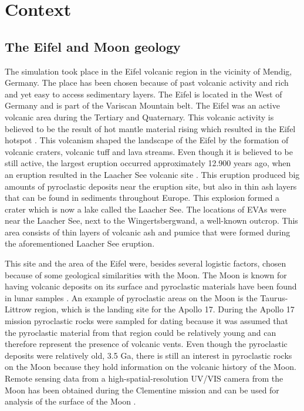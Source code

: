 \documentclass[preprint]{elsarticle}
\begin{document}
\section{Context}

\subsection{The Eifel and Moon geology}
The simulation took place in the Eifel volcanic region in the vicinity of Mendig, Germany. The place has been chosen because of past volcanic activity and rich and yet easy to access sedimentary layers. The Eifel is located in the West of Germany and is part of the Variscan Mountain belt. The Eifel was an active volcanic area during the Tertiary and Quaternary. This volcanic activity is believed to be the result of hot mantle material rising which resulted in the Eifel hotspot \cite{ref13}. This volcanism shaped the landscape of the Eifel by the formation of volcanic craters, volcanic tuff and lava streams. Even though it is believed to be still active, the largest eruption occurred approximately 12.900 years ago, when an eruption resulted in the Laacher See volcanic site \cite{ref14}. This eruption produced big amounts of pyroclastic deposits near the eruption site, but also in thin ash layers that can be found in sediments throughout Europe. This explosion formed a crater which is now a lake called the Laacher See. The locations of EVAs were near the Laacher See, next to the Wingertsbergwand, a well-known outcrop. This area consists of thin layers of volcanic ash and pumice that were formed during the aforementioned Laacher See eruption.

This site and the area of the Eifel were, besides several logistic factors, chosen because of some geological similarities with the Moon. The Moon is known for having volcanic deposits on its surface and pyroclastic materials have been found in lunar samples \cite{ref15}. An example of pyroclastic areas on the Moon is the Taurus-Littrow region, which is the landing site for the Apollo 17. During the Apollo 17 mission pyroclastic rocks were sampled for dating because it was assumed that the pyroclastic material from that region could be relatively young and can therefore represent the presence of volcanic vents. Even though the pyroclastic deposits were relatively old, 3.5 Ga, there is still an interest in pyroclastic rocks on the Moon because they hold information on the volcanic history of the Moon. Remote sensing data from a high-spatial-resolution UV/VIS camera from the Moon has been obtained during the Clementine mission and can be used for analysis of the surface of the Moon \cite{ref16}.
\end{document}
